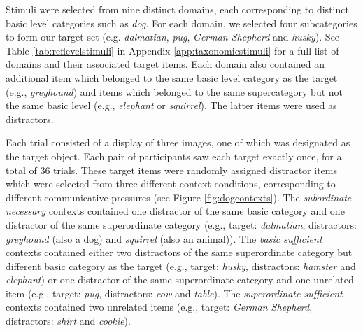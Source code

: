 \documentclass[11pt]{article}
\newcommand{\tableref}[1]{Table \ref{#1}}
\newcommand{\figref}[1]{Figure \ref{#1}}
\newcommand{\appref}[1]{Appendix \ref{#1}}
\begin{document}
Stimuli were selected from nine distinct domains, each corresponding to distinct basic level categories such as \emph{dog}.  For each domain, we selected four subcategories to form our target set (e.g. \emph{dalmatian}, \emph{pug}, \emph{German Shepherd} and \emph{husky}). See \tableref{tab:reflevelstimuli} in \appref{app:taxonomicstimuli} for a full list of domains and their associated target items. Each domain also contained an additional item which belonged to the same basic level category as the target (e.g., \emph{greyhound}) and items which belonged to the same supercategory but not the same basic level (e.g., \emph{elephant} or \emph{squirrel}). The latter items were used as distractors.

Each trial consisted of a display of three images, one of which was designated as the target object. Each pair of participants saw each target exactly once, for a total of 36 trials. These target items were randomly assigned distractor items which were selected from three different context conditions, corresponding to different communicative pressures (see \figref{fig:dogcontexts}). The \emph{subordinate necessary} contexts contained one distractor of the same basic category and one distractor of the same superordinate category (e.g., target: \emph{dalmatian}, distractors: \emph{greyhound} (also a dog) and \emph{squirrel} (also an animal)). The \emph{basic sufficient} contexts contained either two distractors of the same superordinate category but different basic category as the target (e.g., target: \emph{husky}, distractors: \emph{hamster} and \emph{elephant}) or one distractor of the same superordinate category and one unrelated item (e.g., target: \emph{pug}, distractors: \emph{cow} and \emph{table}). The \emph{superordinate sufficient} contexts contained two unrelated items (e.g., target: \emph{German Shepherd}, distractors: \emph{shirt} and \emph{cookie}). 
\end{document}
